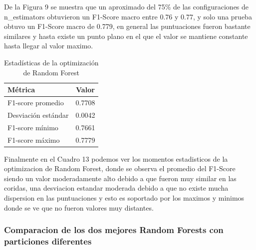 \documentclass[12pt,a4paper]{article}
\begin{document}
De la Figura 9 se muestra que un aproximado del 75\% de las configuraciones de n_estimators
obtuvieron un F1-Score macro entre 0.76 y 0.77, y solo una prueba obtuvo un F1-Score macro de 0.779, en general
las puntuaciones fueron bastante similares y hasta existe un punto plano en el que el valor se mantiene constante
hasta llegar al valor maximo.

\begin{table}[H]
  \centering
  \begin{tabular}{lc}
    \hline
    Métrica & Valor \\
    \hline
    F1-score promedio & 0.7708 \\
    Desviación estándar & 0.0042 \\
    F1-score mínimo & 0.7661 \\
    F1-score máximo & 0.7779 \\
    \hline
  \end{tabular}
  \caption{Estadísticas de la optimización de Random Forest}
  \label{tab:rf-opt-stats}
\end{table}

Finalmente en el Cuadro 13 podemos ver los momentos estadisticos de la optimizacion de Random Forest,
donde se observa el promedio del F1-Score siendo un valor moderadamente alto debido a que fueron muy similar en las coridas,
una desviacion estandar moderada debido a que no existe mucha dispersion en las puntuaciones y esto es soportado
por los maximos y minimos donde se ve que no fueron valores muy distantes.

\subsubsection{Comparacion de los dos mejores Random Forests con particiones diferentes}
\end{document}
